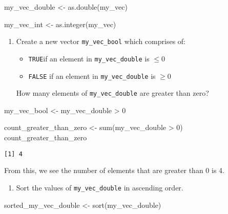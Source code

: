 \documentclass[
  letterpaper,
  DIV=11,
  numbers=noendperiod]{scrartcl}
\newenvironment{Shaded}{\begin{snugshade}}{\end{snugshade}}
\newcommand{\DecValTok}[1]{\textcolor[rgb]{0.68,0.00,0.00}{#1}}
\newcommand{\FunctionTok}[1]{\textcolor[rgb]{0.28,0.35,0.67}{#1}}
\newcommand{\NormalTok}[1]{\textcolor[rgb]{0.00,0.23,0.31}{#1}}
\newcommand{\OtherTok}[1]{\textcolor[rgb]{0.00,0.23,0.31}{#1}}
\newcommand{\SpecialCharTok}[1]{\textcolor[rgb]{0.37,0.37,0.37}{#1}}
\providecommand{\tightlist}{%
  \setlength{\itemsep}{0pt}\setlength{\parskip}{0pt}}\usepackage{longtable,booktabs,array}
\begin{document}
\begin{Shaded}
\begin{Highlighting}[]
\NormalTok{my\_vec\_double }\OtherTok{\textless{}{-}} \FunctionTok{as.double}\NormalTok{(my\_vec)}

\NormalTok{my\_vec\_int }\OtherTok{\textless{}{-}} \FunctionTok{as.integer}\NormalTok{(my\_vec)}
\end{Highlighting}
\end{Shaded}

\begin{enumerate}
\def\labelenumi{\arabic{enumi}.}
\tightlist
\item
  Create a new vector \texttt{my\_vec\_bool} which comprises of:

  \begin{itemize}
  \tightlist
  \item
    \texttt{TRUE}if an element in \texttt{my\_vec\_double} is \(\le 0\)
  \item
    \texttt{FALSE} if an element in \texttt{my\_vec\_double} is
    \(\ge 0\)
  \end{itemize}

  How many elements of \texttt{my\_vec\_double} are greater than zero?
\end{enumerate}

\begin{Shaded}
\begin{Highlighting}[]
\NormalTok{my\_vec\_bool }\OtherTok{\textless{}{-}}\NormalTok{ my\_vec\_double }\SpecialCharTok{\textgreater{}} \DecValTok{0}

\NormalTok{count\_greater\_than\_zero }\OtherTok{\textless{}{-}} \FunctionTok{sum}\NormalTok{(my\_vec\_double }\SpecialCharTok{\textgreater{}} \DecValTok{0}\NormalTok{)}
\NormalTok{count\_greater\_than\_zero}
\end{Highlighting}
\end{Shaded}

\begin{verbatim}
[1] 4
\end{verbatim}

From this, we see the number of elements that are greater than 0 is 4.

\begin{enumerate}
\def\labelenumi{\arabic{enumi}.}
\tightlist
\item
  Sort the values of \texttt{my\_vec\_double} in ascending order.
\end{enumerate}

\begin{Shaded}
\begin{Highlighting}[]
\NormalTok{sorted\_my\_vec\_double }\OtherTok{\textless{}{-}} \FunctionTok{sort}\NormalTok{(my\_vec\_double)}
\end{Highlighting}
\end{Shaded}
\end{document}
